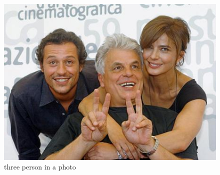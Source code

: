 \documentclass[journal, a4paper]{IEEEtran}
\begin{document}
	\begin{figure}
		\begin{center}
		\includegraphics[width=\columnwidth]{images/img_13692.jpg}
		\caption{three person in a photo}
		\label{fig:13692_raw}
		\end{center}
	\end{figure}
	
\end{document}
